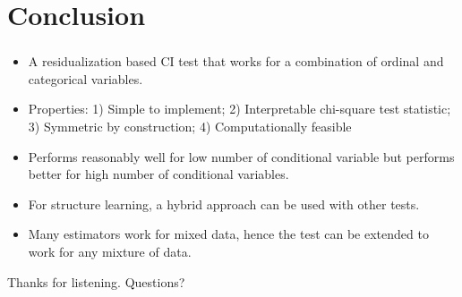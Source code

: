 \documentclass{beamer}
\begin{document}
\section{Conclusion}
\begin{frame}
	\frametitle{}
	\begin{itemize}
		\setlength\itemsep{1em}
		\item A residualization based CI test that works for a combination of ordinal and categorical variables.
		\item Properties: 1) Simple to implement; 2) Interpretable chi-square test statistic; 3) Symmetric by construction; 4) Computationally feasible
		\item Performs reasonably well for low number of
			conditional variable but performs better for high
			number of conditional variables.
		\item For structure learning, a hybrid approach can be used with other
			tests.
		\item Many estimators work for mixed data, hence the test can be extended to work for any mixture of data.
	\end{itemize}
\end{frame}

\begin{frame}
	\begin{center}
		\Huge{Thanks for listening. Questions?}
	\end{center}
\end{frame}
\end{document}
